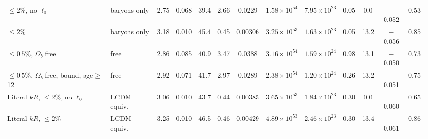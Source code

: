 \documentclass[10pt,letterpaper]{article}
\begin{document}
\begin{table}[H]
\begin{tabular}{llccccccccccc}
$\le2\%$, no $\ell_0$ & baryons only & 2.75 & 0.068 & 39.4 & 2.66 & 0.0229 & $1.58\times10^{54}$ & $7.95\times10^{23}$ & 0.05 & 0.0 & $-$0.052 & 0.53\\
$\le2\%$ & baryons only & 3.18 & 0.010 & 45.4 & 0.45 & 0.00306 & $3.25\times10^{53}$ & $1.63\times10^{23}$ & 0.05 & 13.2 & $-$0.056 & 0.85\\
$\le0.5\%$, $\Omega_b$ free & free & 2.86 & 0.085 & 40.9 & 3.47 & 0.0388 & $3.16\times10^{54}$ & $1.59\times10^{24}$ & 0.98 & 13.1 & $-$0.050 & 0.73\\
$\le0.5\%$, $\Omega_b$ free, bound, age$\ge$12 & free & 2.92 & 0.071 & 41.7 & 2.97 & 0.0289 & $2.38\times10^{54}$ & $1.20\times10^{24}$ & 0.26 & 13.2 & $-$0.051 & 0.75\\
Literal $kR$, $\le2\%$, no $\ell_0$ & LCDM-equiv. & 3.06 & 0.010 & 43.7 & 0.44 & 0.00385 & $3.65\times10^{53}$ & $1.84\times10^{23}$ & 0.30 & 0.0 & $-$0.060 & 0.65\\
Literal $kR$, $\le2\%$ & LCDM-equiv. & 3.25 & 0.010 & 46.5 & 0.46 & 0.00429 & $4.89\times10^{53}$ & $2.46\times10^{23}$ & 0.30 & 13.4 & $-$0.061 & 0.86\\
\bottomrule\end{tabular}\end{table}
\end{document}

